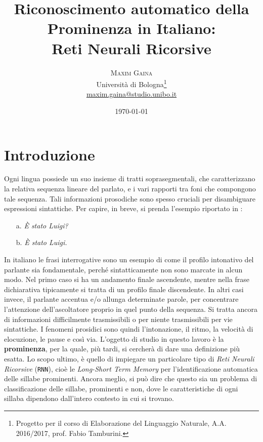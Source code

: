 \documentclass[twoside,twocolumn,10pt]{extarticle}
\title{Riconoscimento automatico della Prominenza in Italiano:\\Reti Neurali Ricorsive} %
\author{%
\textsc{Maxim Gaina} \\[1ex] %
\normalsize Università di Bologna\thanks{Progetto per il corso di Elaborazione del Linguaggio Naturale, A.A. 2016/2017, prof. Fabio Tamburini.} \\ %
\normalsize \href{mailto:maxim.gaina@studio.unibo.it}{maxim.gaina@studio.unibo.it}
}
\date{\today} %
\theoremstyle{definition}
\begin{document}
\maketitle

\tableofcontents

\section*{Introduzione}
	\lettrine[nindent = 0.4em,lines=3]{O}\space\MakeTextLowercase{g}ni lingua possiede un suo insieme di tratti soprasegmentali, che caratterizzano la relativa sequenza lineare del parlato, e i vari rapporti tra foni che compongono tale sequenza. Tali informazioni prosodiche sono spesso cruciali per disambiguare espressioni sintattiche. Per capire, in breve, si prenda l'esempio riportato in \cite{bib:fenomeni-prosodici-prominenza}:
	\begin{itemize}
		\item[a.] \textit{È stato Luigi?}
		\item[b.] \textit{È stato Luigi.}
	\end{itemize}

	In italiano le frasi interrogative sono un esempio di come il profilo intonativo del parlante sia fondamentale, perché sintatticamente non sono marcate in alcun modo. Nel primo caso si ha un andamento finale ascendente, mentre nella frase dichiarativa tipicamente si tratta di un profilo finale discendente. In altri casi invece, il parlante accentua e/o allunga determinate parole, per concentrare l'attenzione dell'ascoltatore proprio in quel punto della sequenza.	 Si tratta ancora di informazioni difficilmente trasmissibili o per niente trasmissibili per vie sintattiche. I fenomeni prosidici sono quindi l'intonazione, il ritmo, la velocità di elocuzione, le pause e così via. L'oggetto di studio in questo lavoro è la \textbf{prominenza}, per la quale, più tardi, si cercherà di dare una definizione più esatta. Lo scopo ultimo, è quello di impiegare un particolare tipo di \textit{Reti Neurali Ricorsive} (\texttt{RNN}), cioè le \textit{Long-Short Term Memory} per l'identificazione automatica delle sillabe prominenti. Ancora meglio, si può dire che questo sia un problema di classificazione delle sillabe, prominenti e non, dove le caratteristiche di ogni sillaba dipendono dall'intero contesto in cui si trovano.
	
\end{document}
